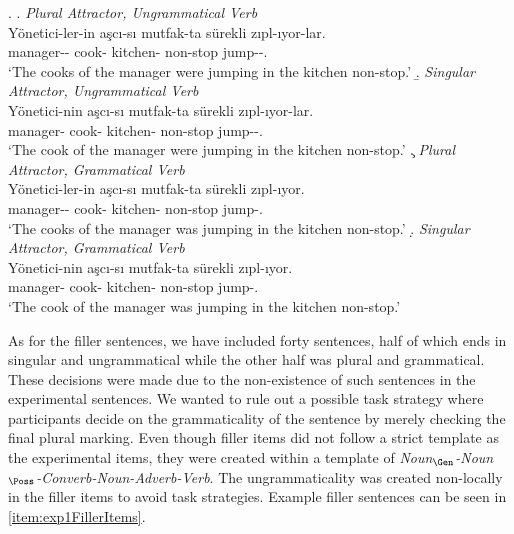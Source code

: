 \documentclass[doc,a4paper,man,natbib,floatsintext,noextraspace]{apa6}\usepackage[]{graphicx}\usepackage[]{color}
\begin{document}
\ex. \label{item:exp1ExperimentalItems}
\a. \textit{Plural Attractor, Ungrammatical Verb} \label{item:exp1expitem-plpl}\\ 
\gll *Yönetici-ler-in aşcı-sı mutfak-ta sürekli zıpl-ıyor-lar.\\ 
manager-\Pl{}-\Gen{}  cook-\Poss{} kitchen-\Loc{} non-stop  jump-\Prog{}-\Pl{}.\\
\glt `The cooks of the manager were jumping in the kitchen non-stop.' 
\b. \textit{Singular Attractor, Ungrammatical Verb} \label{item:exp1expitem-sgpl}\\ 
\gll *Yönetici-nin aşcı-sı mutfak-ta sürekli zıpl-ıyor-lar.\\ 
manager-\Gen{}  cook-\Poss{} kitchen-\Loc{} non-stop  jump-\Prog{}-\Pl{}.\\
\glt `The cook of the manager were jumping in the kitchen non-stop.'
\c. \textit{Plural Attractor, Grammatical Verb} \label{item:exp1expitem-plsg}\\ 
\gll Yönetici-ler-in aşcı-sı mutfak-ta sürekli zıpl-ıyor.\\ 
manager-\Pl{}-\Gen{}  cook-\Poss{} kitchen-\Loc{} non-stop  jump-\Prog{}.\\
\glt `The cooks of the manager was jumping in the kitchen non-stop.'
\d. \textit{Singular Attractor, Grammatical Verb}\label{item:exp1expitem-sgsg}\\ 
\gll Yönetici-nin aşcı-sı mutfak-ta sürekli zıpl-ıyor. \\ 
manager-\Gen{}  cook-\Poss{} kitchen-\Loc{} non-stop  jump-\Prog{}.\\
\glt `The cook of the manager was jumping in the kitchen non-stop.'

As for the filler sentences, we have included forty sentences, half of which ends in singular and ungrammatical while the other half was plural and grammatical. These decisions were made due to the non-existence of such sentences in the experimental sentences. We wanted to rule out a possible task strategy where participants decide on the grammaticality of the sentence by merely checking the final plural marking. Even though filler items did not follow a strict template as the experimental items, they were created within a template of \textit{Noun$_{\Gen}$-Noun$_{\Poss}$-Converb-Noun-Adverb-Verb}. The ungrammaticality was created non-locally in the filler items to avoid task strategies. Example filler sentences can be seen in \ref{item:exp1FillerItems}.
\end{document}
